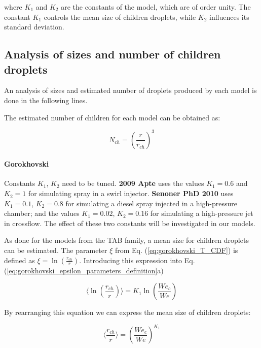where $K_1$ and $K_2$ are the constants of the model, which are of order unity. The constant $K_1$ controls the mean size of children droplets, while $K_2$ influences its standard deviation.






\subsection{Analysis of sizes and number of children droplets}

An analysis of sizes and estimated number of droplets produced by each model is done in the following lines.

The estimated number of children for each model can be obtained as:

\begin{equation}
N_{ch} = \left( \frac{r}{r_{ch}} \right)^3
\end{equation}

\paragraph{Gorokhovski} Constants $K_1$, $K_2$ need to be tuned. \textbf{2009 Apte} uses the values $K_1 = 0.6$ and $K_2 = 1$ for simulating spray in a swirl injector. \textbf{Senoner PhD 2010} uses $K_1 = 0.1$, $K_2 = 0.8$ for simulating a diesel spray injected in a high-pressure chamber; and the values  $K_1 = 0.02$, $K_2 = 0.16$ for simulating a high-pressure jet in crossflow. The effect of these two constants will be investigated in our models.

As done for the models from the TAB family, a mean size for children droplets can be estimated. The parameter $\xi$ from Eq. (\ref{eq:gorokhovski_T_CDF}) is defined as $\xi = \ln \left( \frac{r_{ch}}{r}  \right)$. Introducing this expression into Eq. (\ref{eq:gorokhovski_epsilon_parameters_definition}a) 

\begin{equation}
\langle \ln \left( \frac{r_{ch}}{r}  \right) \rangle = K_1  \ln \left(  \frac{We_c}{We}  \right) 
\end{equation}

By rearranging this equation we can express the mean size of children droplets:

\begin{equation}
\langle  \frac{r_{ch}}{r} \rangle = \left( \frac{We_c}{We} \right)^{K_1}
\end{equation}

